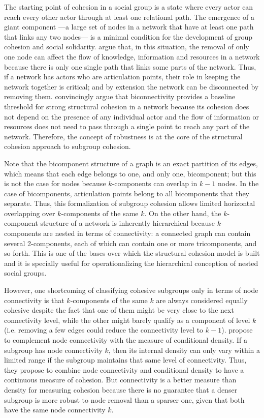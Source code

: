 The starting point of cohesion in a social group is a state where every actor can reach every other actor through at least one relational path. The emergence of a giant component ---a large set of nodes in a network that have at least one path that links any two nodes--- is a minimal condition for the development of group cohesion and social solidarity. \citet{moody:2003} argue that, in this situation, the removal of only one node can affect the flow of knowledge, information and resources in a network because there is only one single path that links some parts of the network. Thus, if a network has actors who are articulation points, their role in keeping the network together is critical; and by extension the network can be disconnected by removing them.  \citet{moody:2003} convincingly argue that biconnectivity provides a baseline threshold for strong structural cohesion in a network because its cohesion does not depend on the presence of any individual actor and the flow of information or resources does not need to pass through a single point to reach any part of the network. Therefore, the concept of robustness is at the core of the structural cohesion approach to subgroup cohesion.

Note that the bicomponent structure of a graph is an exact partition of its edges, which means that each edge belongs to one, and only one, bicomponent; but this is not the case for nodes because $k$-components can overlap in $k-1$ nodes. In the case of bicomponents, articulation points belong to all bicomponents that they separate. Thus, this formalization of subgroup cohesion allows limited horizontal overlapping over $k$-components of the same $k$. On the other hand, the $k$-component structure of a network is inherently hierarchical because $k$-components are nested in terms of connectivity: a connected graph can contain several 2-components, each of which can contain one or more tricomponents, and so forth. This is one of the bases over which the structural cohesion model is built and it is specially useful for operationalizing the hierarchical conception of nested social groups.

However, one shortcoming of classifying cohesive subgroups only in terms of node connectivity is that $k$-components of the same $k$ are always considered equally cohesive despite the fact that one of them might be very close to the next connectivity level, while the other might barely qualify as a component of level $k$ (i.e. removing a few edges could reduce the connectivity level to $k - 1$). \citet{white:2001} propose to complement node connectivity with the measure of conditional density. If a subgroup has node connectivity $k$, then its internal density can only vary within a limited range if the subgroup maintains that same level of connectivity. Thus, they propose to combine node connectivity and conditional density to have a continuous measure of cohesion.  But connectivity is a better measure than density for measuring cohesion because there is no guarantee that a denser subgroup is more robust to node removal than a sparser one, given that both have the same node connectivity $k$.

